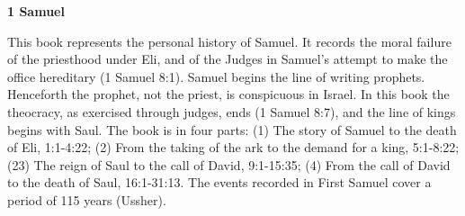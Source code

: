\documentclass[11pt,landscape,twocolumn,letterpaper]{article}
\begin{document}
\begin{center}
\textbf{1 Samuel}
\end{center}
This book represents the personal history of Samuel. It records the moral failure of the priesthood under Eli, and of the Judges in Samuel's attempt to make the office hereditary (1 Samuel 8:1). Samuel begins the line of writing prophets. Henceforth the prophet, not the priest, is conspicuous in Israel. In this book the theocracy, as exercised through judges, ends (1 Samuel 8:7), and the line of kings begins with Saul. The book is in four parts: (1) The story of Samuel to the death of Eli, 1:1-4:22; (2) From the taking of the ark to the demand for a king, 5:1-8:22; (23) The reign of Saul to the call of David, 9:1-15:35; (4) From the call of David to the death of Saul, 16:1-31:13. The events recorded in First Samuel cover a period of 115 years (Ussher). 
\end{document}
